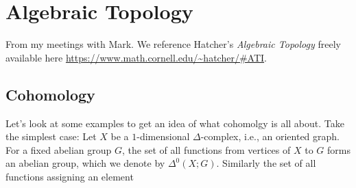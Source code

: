 \chapter{Algebraic Topology}
From my meetings with Mark. We reference Hatcher's \emph{Algebraic
  Topology} \cite{hatcher} freely available here
\url{https://www.math.cornell.edu/~hatcher/#ATI}.

\section{Cohomology}
Let's look at some examples to get an idea of what cohomolgy is all
about. Take the simplest case: Let \(X\) be a \(1\)-dimensional
\(\Delta\)-complex, i.e., an oriented graph. For a fixed abelian group
\(G\), the set of all functions from vertices of \(X\) to \(G\) forms an
abelian group, which we denote by \(\Delta^0(X;G)\). Similarly the set of
all functions assigning an element

